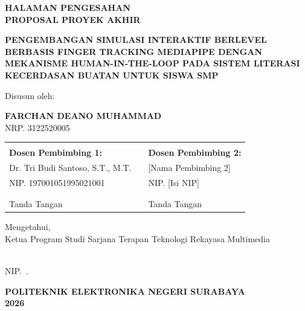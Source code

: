 \documentclass[12pt,oneside]{report}
\begin{document}
\begin{titlepage}
\begin{center}

\vspace*{1cm}

{\bfseries\large HALAMAN PENGESAHAN}\\
{\bfseries\large PROPOSAL PROYEK AKHIR}

\vspace{1cm}

{\bfseries\MakeUppercase{PENGEMBANGAN SIMULASI INTERAKTIF BERLEVEL BERBASIS FINGER TRACKING MEDIAPIPE DENGAN MEKANISME HUMAN-IN-THE-LOOP PADA SISTEM LITERASI KECERDASAN BUATAN UNTUK SISWA SMP}}

\vspace{1.5cm}

{\large Disusun oleh:}

\vspace{0.3cm}

{\large \bfseries FARCHAN DEANO MUHAMMAD}\\
{\large NRP. 3122520005}

\vspace{2cm}

\begin{tabular}{lcl}
& & \\
\textbf{Dosen Pembimbing 1:} & & \textbf{Dosen Pembimbing 2:} \\[0.3cm]
Dr. Tri Budi Santoso, S.T., M.T. & & [Nama Pembimbing 2] \\
NIP. 197001051995021001 & & NIP. [Isi NIP] \\[1cm]
& & \\
\underline{\hspace{4cm}} & & \underline{\hspace{4cm}} \\[0.2cm]
Tanda Tangan & & Tanda Tangan \\
\end{tabular}

\vspace{2cm}

Mengetahui,\\
Ketua Program Studi Sarjana Terapan Teknologi Rekayasa Multimedia

\vspace{1.5cm}

\underline{\hspace{5cm}}\\
NIP.\ .

\vspace{1cm}

{\bfseries POLITEKNIK ELEKTRONIKA NEGERI SURABAYA}\\
{\bfseries 2026}

\end{center}
\end{titlepage}
\end{document}
